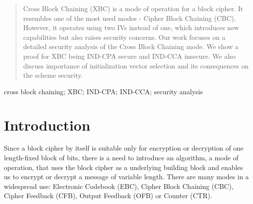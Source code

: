 \documentclass[conference]{IEEEtran}
\begin{document}




\maketitle

\begin{abstract}
Cross Block Chaining (XBC) is a mode of operation for a block cipher. It resembles one of the most used modes - Cipher Block Chaining (CBC). However, it operates using two IVs instead of one, which introduces new capabilities but also raises security concerns. Our work focuses on a detailed security analysis of the Cross Block Chaining mode. We show a proof for XBC being IND-CPA secure and IND-CCA insecure. We also discuss importance of initialization vector selection and its consequences on the scheme security.
\end{abstract}

\begin{keywords}
cross block chaining; XBC; IND-CPA; IND-CCA; security analysis
\end{keywords}

%
\IEEEpeerreviewmaketitle

\section{Introduction}

Since a block cipher by itself is suitable only for encryption or decryption of one length-fixed block of bits, there is a need to introduce an algorithm, a mode of operation, that uses the block cipher as a underlying building block and enables us to encrypt or decrypt a message of variable length. There are many modes in a widespread use: Electronic Codebook (EBC), Cipher Block Chaining (CBC), Cipher Feedback (CFB), Output Feedback (OFB) or Counter (CTR).
\end{document}
